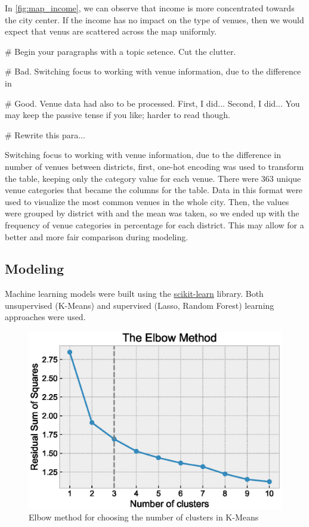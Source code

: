 \documentclass[12pt]{article}
\begin{document}
In \autoref{fig:map_income}, we can observe that
 income is more concentrated towards the city center. If the income has no impact on the type of venues, then we would expect that venus are scattered across the map uniformly.
 

# Begin your paragraphs with a topic setence. Cut the clutter.

# Bad. Switching focus to working with venue information, due to the difference in

# Good. Venue data had also to be processed. First, I did... Second, I did... You may keep the passive tense if you like; harder to read though.
 
 
# Rewrite this para...

Switching focus to working with venue information, due to the difference in
number of venues between districts, first, one-hot encoding was used to
transform the table, keeping only the category value for each venue. There were
363 unique venue categories that became the columns for the table. Data in this
format were used to visualize the most common venues in the whole city. Then, the
values were grouped by district with and the mean was taken, so we ended up with
the frequency of venue categories in percentage for each district. This may
allow for a better and more fair comparison during modeling.


\subsection{Modeling}

Machine learning models were built using the
\href{https://scikit-learn.org/stable/index.html}{scikit-learn} library. Both
unsupervised (K-Means) and supervised (Lasso, Random Forest) learning approaches
were used.

\begin{figure} \centering
        \includegraphics[width=\linewidth]{plot_elbow.eps}
        \caption{Elbow method for choosing the number of clusters in
        K-Means\label{fig:plot_elbow}}
\end{figure}
\end{document}
